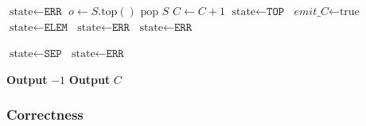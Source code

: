 \documentclass[11pt]{article}
\begin{document}
\addtocounter{algorithm}{-1}
\begin{algorithm}[H]
\caption{Streaming Message Parser (Part 2)}
\begin{algorithmic}[1]

\If{$\sigma \in \{\text{]}, \text{\}}\}$ (close bracket/brace)}
        \State $\text{state} \gets \texttt{ERR}$
        \State $o \gets S.\text{top}()$
            \State $\text{pop } S$
                \State $C \gets C + 1$
                \State $\text{state} \gets \texttt{TOP}$
                \State $\textit{emit\_C} \gets \text{true}$
            \Else
                \State $\text{state} \gets \texttt{ELEM}$
            \EndIf
        \Else
            \State $\text{state} \gets \texttt{ERR}$
        \EndIf
    \Else
        \State $\text{state} \gets \texttt{ERR}$
    \EndIf
\EndIf

\If{$\sigma = \text{,}$}
        \State $\text{state} \gets \texttt{SEP}$
    \Else
        \State $\text{state} \gets \texttt{ERR}$
    \EndIf
\EndIf

    \State \textbf{Output} $-1$ 
    \State \textbf{Output} $C$
\EndIf
\end{algorithmic}
\end{algorithm}

\subsubsection*{Correctness}
\end{document}
